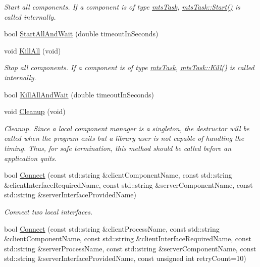 \begin{DoxyCompactItemize}
\begin{DoxyCompactList}\small\item\em Start all components. If a component is of type \hyperlink{classmts_task}{mts\-Task}, \hyperlink{classmts_component_abfb4a63739ec45a9cdb91e3363db7c5c}{mts\-Task\-::\-Start()} is called internally. \end{DoxyCompactList}\item 
bool \hyperlink{classmts_manager_local_a5f60a05bb9cb176856fd81ac6b87d95f}{Start\-All\-And\-Wait} (double timeout\-In\-Seconds)
\item 
void \hyperlink{classmts_manager_local_ad3c234dc4d886414f68e218c573d4489}{Kill\-All} (void)
\begin{DoxyCompactList}\small\item\em Stop all components. If a component is of type \hyperlink{classmts_task}{mts\-Task}, \hyperlink{classmts_task_a67a15d7fffef28708b813e2ea624e4f8}{mts\-Task\-::\-Kill()} is called internally. \end{DoxyCompactList}\item 
bool \hyperlink{classmts_manager_local_a14ee33b85977480846050a42827d368c}{Kill\-All\-And\-Wait} (double timeout\-In\-Seconds)
\item 
void \hyperlink{classmts_manager_local_a475c241a9228eeb53bb7227a3fa348a3}{Cleanup} (void)
\begin{DoxyCompactList}\small\item\em Cleanup. Since a local component manager is a singleton, the destructor will be called when the program exits but a library user is not capable of handling the timing. Thus, for safe termination, this method should be called before an application quits. \end{DoxyCompactList}\item 
bool \hyperlink{classmts_manager_local_abbc3c68b1860cf6a3dda6acaae63722f}{Connect} (const std\-::string \&client\-Component\-Name, const std\-::string \&client\-Interface\-Required\-Name, const std\-::string \&server\-Component\-Name, const std\-::string \&server\-Interface\-Provided\-Name)
\begin{DoxyCompactList}\small\item\em Connect two local interfaces. \end{DoxyCompactList}\item 
bool \hyperlink{classmts_manager_local_a23f4154fc0afcd149e268a8bc114ae2e}{Connect} (const std\-::string \&client\-Process\-Name, const std\-::string \&client\-Component\-Name, const std\-::string \&client\-Interface\-Required\-Name, const std\-::string \&server\-Process\-Name, const std\-::string \&server\-Component\-Name, const std\-::string \&server\-Interface\-Provided\-Name, const unsigned int retry\-Count=10)

\end{DoxyCompactItemize}
